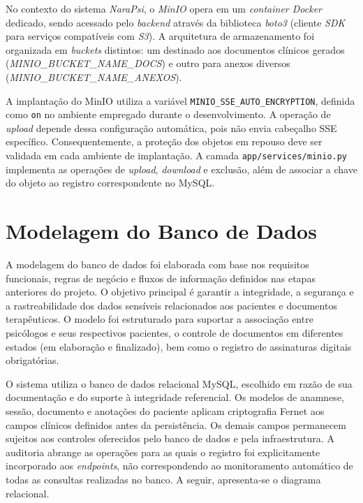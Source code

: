 No contexto do sistema \textit{NaraPsi}, o \textit{MinIO} opera em um \textit{container Docker} dedicado, sendo acessado pelo \textit{backend} através da biblioteca \textit{boto3} (cliente \textit{SDK} para serviços compatíveis com \textit{S3}). A arquitetura de armazenamento foi organizada em \textit{buckets} distintos: um destinado aos documentos clínicos gerados (\textit{MINIO\_BUCKET\_NAME\_DOCS}) e outro para anexos diversos (\textit{MINIO\_BUCKET\_NAME\_ANEXOS}).

A implantação do MinIO utiliza a variável \texttt{MINIO\_SSE\_AUTO\_ENCRYPTION}, definida como \texttt{on} no ambiente empregado durante o desenvolvimento. A operação de \textit{upload} depende dessa configuração automática, pois não envia cabeçalho SSE específico. Consequentemente, a proteção dos objetos em repouso deve ser validada em cada ambiente de implantação. A camada \texttt{app/services/minio.py} implementa as operações de \textit{upload}, \textit{download} e exclusão, além de associar a chave do objeto ao registro correspondente no MySQL.

\section{Modelagem do Banco de Dados}

A modelagem do banco de dados foi elaborada com base nos requisitos funcionais, regras de negócio e fluxos de informação definidos nas etapas anteriores do projeto. O objetivo principal é garantir a integridade, a segurança e a rastreabilidade dos dados sensíveis relacionados aos pacientes e documentos terapêuticos. O modelo foi estruturado para suportar a associação entre psicólogos e seus respectivos pacientes, o controle de documentos em diferentes estados (em elaboração e finalizado), bem como o registro de assinaturas digitais obrigatórias.

O sistema utiliza o banco de dados relacional MySQL, escolhido em razão de sua documentação e do suporte à integridade referencial. Os modelos de anamnese, sessão, documento e anotações do paciente aplicam criptografia Fernet aos campos clínicos definidos antes da persistência. Os demais campos permanecem sujeitos aos controles oferecidos pelo banco de dados e pela infraestrutura. A auditoria abrange as operações para as quais o registro foi explicitamente incorporado aos \textit{endpoints}, não correspondendo ao monitoramento automático de todas as consultas realizadas no banco. A seguir, apresenta-se o diagrama relacional.


